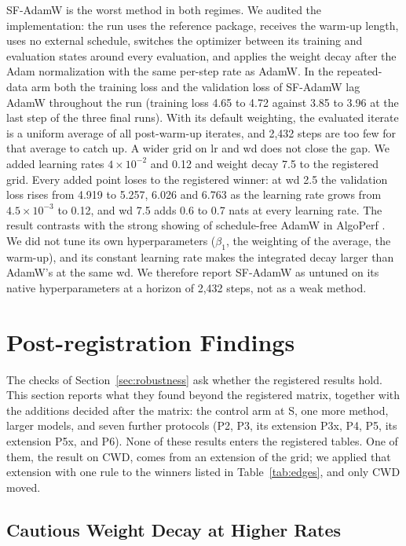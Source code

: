 \documentclass[twoside,11pt]{article}
\begin{document}
SF-AdamW is the worst method in both regimes. We audited the implementation: the run uses the reference package, receives the warm-up length, uses no external schedule, switches the optimizer between its training and evaluation states around every evaluation, and applies the weight decay after the Adam normalization with the same per-step rate as AdamW. In the repeated-data arm both the training loss and the validation loss of SF-AdamW lag AdamW throughout the run (training loss 4.65 to 4.72 against 3.85 to 3.96 at the last step of the three final runs). With its default weighting, the evaluated iterate is a uniform average of all post-warm-up iterates, and 2,432 steps are too few for that average to catch up. A wider grid on lr and wd does not close the gap. We added learning rates $4\times10^{-2}$ and 0.12 and weight decay 7.5 to the registered grid. Every added point loses to the registered winner: at wd 2.5 the validation loss rises from 4.919 to 5.257, 6.026 and 6.763 as the learning rate grows from $4.5\times10^{-3}$ to 0.12, and wd 7.5 adds 0.6 to 0.7 nats at every learning rate. The result contrasts with the strong showing of schedule-free AdamW in AlgoPerf \citep{kasimbeg2025algoperf}. We did not tune its own hyperparameters ($\beta_1$, the weighting of the average, the warm-up), and its constant learning rate makes the integrated decay larger than AdamW's at the same wd. We therefore report SF-AdamW as untuned on its native hyperparameters at a horizon of 2,432 steps, not as a weak method.

\section{Post-registration Findings}
\label{sec:post}

The checks of Section~\ref{sec:robustness} ask whether the registered results hold. This section reports what they found beyond the registered matrix, together with the additions decided after the matrix: the control arm at S, one more method, larger models, and seven further protocols (P2, P3, its extension P3x, P4, P5, its extension P5x, and P6). None of these results enters the registered tables. One of them, the result on CWD, comes from an extension of the grid; we applied that extension with one rule to the winners listed in Table~\ref{tab:edges}, and only CWD moved.

\subsection{Cautious Weight Decay at Higher Rates}
\label{sec:cwd}
\end{document}
